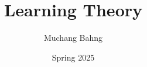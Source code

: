\documentclass{article}
\begin{document}
\title{Learning Theory}
\author{Muchang Bahng}
\date{Spring 2025}

\maketitle
\tableofcontents
\pagebreak










\end{document}
